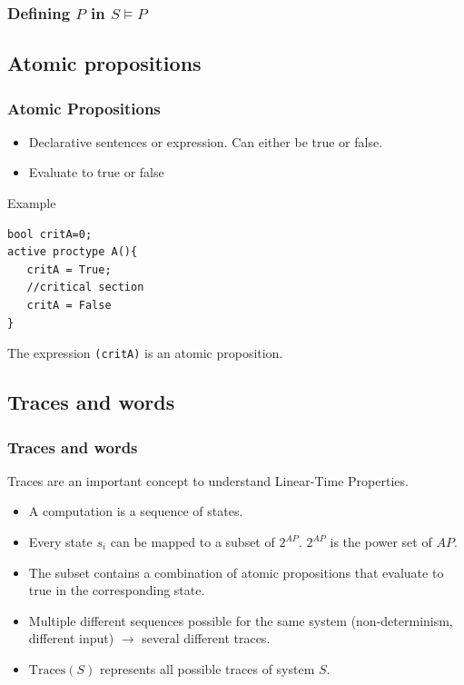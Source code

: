 \documentclass{beamer}
\begin{document}
\begin{frame}
  \frametitle{Defining $P$ in $S \models P$}
  

\end{frame}

\subsection{Atomic propositions}


\begin{frame}[fragile]
  \frametitle{Atomic Propositions}
  \begin{itemize}
  \item Declarative sentences or expression. Can either be true or false.
  \item Evaluate to true or false
  \end{itemize}
  \begin{block}{Example}
\begin{lstlisting}
bool critA=0;
active proctype A(){
   critA = True;
   //critical section
   critA = False
}
\end{lstlisting}
The expression \texttt{(critA)} is an atomic proposition.
  \end{block}
\end{frame}

\subsection{Traces and words}

\begin{frame}
  \frametitle{Traces and words}
  Traces are an important concept to understand Linear-Time Properties.
  \begin{itemize}
  \item A computation is a sequence of states.
  \item Every state $s_i$ can be mapped to a subset of $2^{AP}$. $2^{AP}$ is the power set of $AP$.
  \item The subset contains a combination of atomic propositions that evaluate to true in the corresponding state.
  \item Multiple different sequences possible for the same system (non-determinism, different input) $\rightarrow$ several different traces.
  \item $\text{Traces}(S)$ represents all possible traces of system $S$.
  \end{itemize}
\end{frame}
\end{document}
